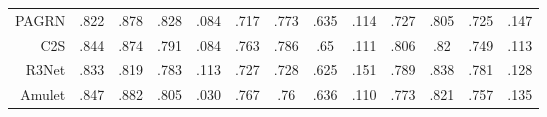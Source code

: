 \begin{table}[!ht]
{\begin{tabular}{rcccccccccccc}
			PAGRN \upcite{wang2018detect}
			& .822 & .878 & .828 & .084 
			& .717 & .773 & .635 & .114 
			& .727 & .805 & .725 & .147 \\
			
			C2S   \upcite{li2018contour}
			& .844 & .874 & .791 & .084 
			& .763 & .786 & .65  & .111 
			& .806 & .82  & .749 & .113 \\
			
			R3Net  \upcite{deng2018r3net}
			& .833 & .819 & .783 & .113 
			& .727 & .728 & .625 & .151 
			& .789 & .838 & .781 & .128 \\
			
			Amulet \upcite{zhang2017amulet}
			& .847 & .882 & .805 & .030 
			& .767 & .76  & .636 & .110  
			& .773 & .821 & .757 & .135 \\
			
			
			\bottomrule[2pt] %
		\end{tabular}
	}
\end{table}



